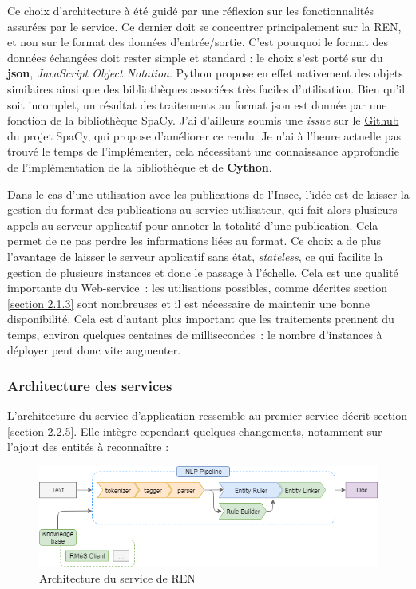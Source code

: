 Ce choix d'architecture à été guidé par une réflexion sur les fonctionnalités assurées par le service. Ce dernier doit se concentrer principalement sur la REN, et non sur le format des données d'entrée/sortie. C'est pourquoi le format des données échangées doit rester simple et standard : le choix s'est porté sur du \textbf{json}, \textit{JavaScript Object Notation}. Python propose en effet nativement des objets similaires ainsi que des bibliothèques associées très faciles d'utilisation. Bien qu'il soit incomplet, un résultat des traitements au format json est donnée par une fonction de la bibliothèque SpaCy. J'ai d'ailleurs soumis une \textit{issue} sur le \href{https://github.com/explosion/spaCy/issues/3987}{Github} \cite{spacy-issue} du projet SpaCy, qui propose d'améliorer ce rendu. Je n'ai à l'heure actuelle pas trouvé le temps de l'implémenter, cela nécessitant une connaissance approfondie de l'implémentation de la bibliothèque et de \textbf{Cython}.

Dans le cas d'une utilisation avec les publications de l'Insee, l'idée est de laisser la gestion du format des publications au service utilisateur, qui fait alors plusieurs appels au serveur applicatif pour annoter la totalité d'une publication. Cela permet de ne pas perdre les informations liées au format. Ce choix a de plus l'avantage de laisser le serveur applicatif sans état, \textit{stateless}, ce qui facilite la gestion de plusieurs instances et donc le passage à l'échelle. Cela est une qualité importante du Web-service~: les utilisations possibles, comme décrites section \ref{section 2.1.3} sont nombreuses et il est nécessaire de maintenir une bonne disponibilité. Cela est d'autant plus important que les traitements prennent du temps, environ quelques centaines de millisecondes~: le nombre d'instances à déployer peut donc vite augmenter. 
\newline
\label{section 3.2.1}

\subsubsection*{Architecture des services}
L'architecture du service d'application ressemble au premier service décrit section \ref{section 2.2.5}. Elle intègre cependant quelques changements, notamment sur l'ajout des entités à reconnaître :
\vspace{10pt}
\begin{figure}[H]
    \centering
    \includegraphics[scale=0.7]{images/InspaCy-archi.png}
    \caption{Architecture du service de REN}
    \label{fig:inspacy-archi}
\end{figure}
\vspace{10pt}

